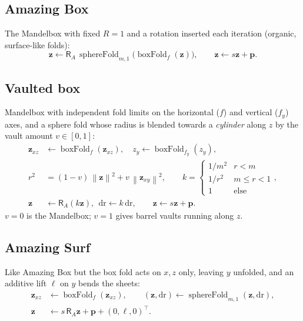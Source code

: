\documentclass[10pt,a4paper]{article}
\newcommand{\vv}[1]{\mathbf{#1}}
\newcommand{\norm}[1]{\left\lVert#1\right\rVert}
\newcommand{\Rot}{\mathsf{R}}
\newcommand{\sfold}{\operatorname{sphereFold}}
\newcommand{\bfold}{\operatorname{boxFold}}
\begin{document}
\subsection{Amazing Box}
The Mandelbox with fixed $R=1$ and a rotation inserted each iteration (organic, surface-like folds):
\begin{equation}
\vv z\leftarrow\Rot_A\,\sfold_{m,1}\big(\bfold_f(\vv z)\big),\qquad\vv z\leftarrow s\vv z+\vv p.
\end{equation}


\subsection{Vaulted box}
Mandelbox with independent fold limits on the horizontal ($f$) and vertical ($f_y$) axes, and a sphere fold whose radius is blended towards a \emph{cylinder} along $z$ by the vault amount $v\in[0,1]$:
\begin{align}
\vv z_{xz}&\leftarrow\bfold_f(\vv z_{xz}),\quad z_y\leftarrow\bfold_{f_y}(z_y),\\
r^2&=(1-v)\,\norm{\vv z}^2+v\,\norm{\vv z_{xy}}^2,\qquad
k=\begin{cases}1/m^2&r<m\\1/r^2&m\le r<1\\1&\text{else}\end{cases},\\
\vv z&\leftarrow\Rot_A(k\vv z),\ \ \mathrm{dr}\leftarrow k\,\mathrm{dr},\qquad \vv z\leftarrow s\vv z+\vv p.
\end{align}
$v=0$ is the Mandelbox; $v=1$ gives barrel vaults running along $z$.


\subsection{Amazing Surf}
Like Amazing Box but the box fold acts on $x,z$ only, leaving $y$ unfolded, and an additive lift $\ell$ on $y$ bends the sheets:
\begin{align}
\vv z_{xz}&\leftarrow\bfold_f(\vv z_{xz}),\qquad(\vv z,\mathrm{dr})\leftarrow\sfold_{m,1}(\vv z,\mathrm{dr}),\\
\vv z&\leftarrow s\,\Rot_A\vv z+\vv p+(0,\ell,0)^{\!\top}.
\end{align}

\end{document}
